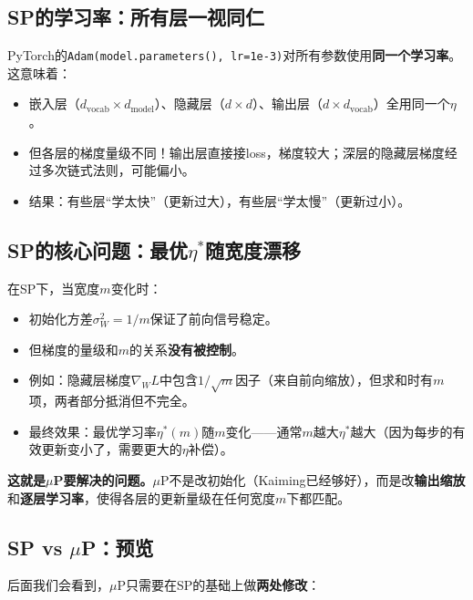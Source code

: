 \documentclass[11pt,a4paper]{article}
\begin{document}
\subsection{SP的学习率：所有层一视同仁}

PyTorch的\texttt{Adam(model.parameters(), lr=1e-3)}对所有参数使用\textbf{同一个学习率}。这意味着：

\begin{itemize}[leftmargin=*]
\item 嵌入层（$d_{\text{vocab}}\times d_{\text{model}}$）、隐藏层（$d\times d$）、输出层（$d\times d_{\text{vocab}}$）全用同一个$\eta$。
\item 但各层的梯度量级不同！输出层直接接loss，梯度较大；深层的隐藏层梯度经过多次链式法则，可能偏小。
\item 结果：有些层``学太快''（更新过大），有些层``学太慢''（更新过小）。
\end{itemize}

\subsection{SP的核心问题：最优$\eta^*$随宽度漂移}

\begin{keyinsight}[——SP为什么不支持超参数迁移]
在SP下，当宽度$m$变化时：
\begin{itemize}[leftmargin=*]
\item 初始化方差$\sigma_W^2=1/m$保证了前向信号稳定。
\item 但梯度的量级和$m$的关系\textbf{没有被控制}。
\item 例如：隐藏层梯度$\nabla_W L$中包含$1/\sqrt{m}$因子（来自前向缩放），但求和时有$m$项，两者部分抵消但不完全。
\item 最终效果：最优学习率$\eta^*(m)$随$m$变化——通常$m$越大$\eta^*$越大（因为每步的有效更新变小了，需要更大的$\eta$补偿）。
\end{itemize}

\textbf{这就是$\mu$P要解决的问题。}$\mu$P不是改初始化（Kaiming已经够好），而是改\textbf{输出缩放}和\textbf{逐层学习率}，使得各层的更新量级在任何宽度$m$下都匹配。
\end{keyinsight}

\subsection{SP vs $\mu$P：预览}

后面我们会看到，$\mu$P只需要在SP的基础上做\textbf{两处修改}：
\end{document}
